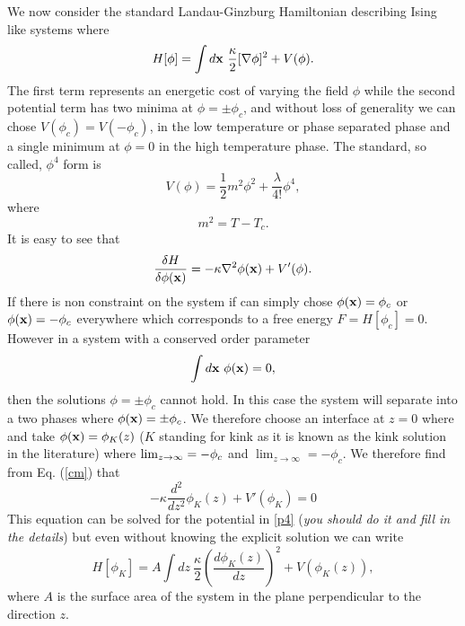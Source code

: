 \documentclass[11pt]{report}
\begin{document}
We now consider the standard Landau-Ginzburg Hamiltonian describing Ising like systems where
\begin{equation}
H[\phi] = \int d{\bf x} \ \frac{\kappa}{2}[\nabla \phi]^2 + V(\phi) .
\end{equation}
The first term represents an energetic cost of varying the field $\phi$ while the second potential term has two minima at $\phi=\pm \phi_c$, and without loss of generality we can chose  $V(\phi_c)=V(-\phi_c)$, in the low temperature or phase separated phase and a single minimum at $\phi=0$ in the high temperature phase. The standard, so called, $\phi^4$ form is
\begin{equation}
V(\phi) = \frac{1}{2} m^2 \phi^2 + \frac{\lambda}{4!} \phi^4,\label{p4}
\end{equation} 
where 
\begin{equation}
m^2 = T-T_c.
\end{equation}
It is easy to see that 
\begin{equation}
\frac{\delta H}{\delta \phi({\bf x})} = -\kappa \nabla^2 \phi({\bf x}) + V'(\phi).\label{cm}
\end{equation}
If there is non constraint on the system if can simply chose $\phi({\bf x}) =\phi_c$ or $\phi({\bf x}) =-\phi_c$ everywhere which corresponds to a  free energy $F=H[\phi_c]=0$. However in a system with a conserved order parameter
\begin{equation}
\int d{\bf x} \  \phi({\bf x})=0, 
\end{equation}
then the solutions $\phi=\pm \phi_c$ cannot hold. In this case the system will separate into a two phases where $\phi({\bf x})= \pm \phi_c$. We therefore choose an interface at $z=0$ where 
and take $\phi({\bf x}) = \phi_K(z)$ ($K$ standing for kink as it is known as the kink solution in the literature) where $\lim_{z\to\-\infty}=-\phi_c$ and  $\lim_{z\to\infty}=-\phi_c$. 
We therefore find from Eq. (\ref{cm}) that
\begin{equation}
-\kappa \frac{d^2 }{dz^2}\phi_K(z)  + V'(\phi_K) = 0 \label{kk0}
\end{equation}
This equation can be solved for the potential in \eqref{p4} ({\em you should do it and fill in the details}) but even without knowing the explicit solution we can write
\begin{equation}
H[\phi_K]=  A\int dz \ \frac{\kappa}{2}\left(\frac{d\phi_K(z)}{dz}\right)^2 + V(\phi_K(z)),\label{kk1}
\end{equation}
where $A$ is the surface area of the system in the plane perpendicular to the direction $z$. 
\end{document}
